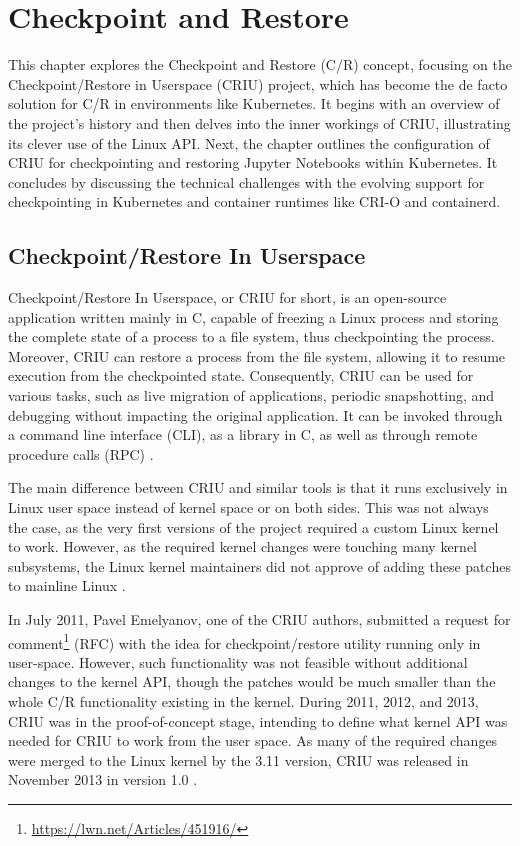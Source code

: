 \documentclass[
  digital,     %
  oneside,     %
  nosansbold,  %
  nocolorbold, %
  lof,         %
  nolot,         %
]{fithesis4}
\begin{document}
\chapter{Checkpoint and Restore}
\label{chap:cr}

This chapter explores the Checkpoint and Restore (C/R) concept, focusing on the Checkpoint/Restore in Userspace (CRIU) project, which has become the de facto solution for C/R in environments like Kubernetes. It begins with an overview of the project's history and then delves into the inner workings of CRIU, illustrating its clever use of the Linux API. Next, the chapter outlines the configuration of CRIU for checkpointing and restoring Jupyter Notebooks within Kubernetes. It concludes by discussing the technical challenges with the evolving support for checkpointing in Kubernetes and container runtimes like CRI-O and containerd.

\section{Checkpoint/Restore In Userspace}
Checkpoint/Restore In Userspace, or CRIU for short, is an open-source application written mainly in C, capable of freezing a Linux process and storing the complete state of a process to a file system, thus checkpointing the process. Moreover, CRIU can restore a process from the file system, allowing it to resume execution from the checkpointed state. Consequently, CRIU can be used for various tasks, such as live migration of applications, periodic snapshotting, and debugging without impacting the original application. It can be invoked through a command line interface (CLI), as a library in C, as well as through remote procedure calls (RPC) \cite{criu_main}.

The main difference between CRIU and similar tools is that it runs exclusively in Linux user space instead of kernel space or on both sides. This was not always the case, as the very first versions of the project required a custom Linux kernel to work. However, as the required kernel changes were touching many kernel subsystems, the Linux kernel maintainers did not approve of adding these patches to mainline Linux \cite{criu_podcast}.

In July 2011, Pavel Emelyanov, one of the CRIU authors, submitted a request for comment\footnote{\url{https://lwn.net/Articles/451916/}} (RFC) with the idea for checkpoint/restore utility running only in user-space. However, such functionality was not feasible without additional changes to the kernel API, though the patches would be much smaller than the whole C/R functionality existing in the kernel. During 2011, 2012, and 2013, CRIU was in the proof-of-concept stage, intending to define what kernel API was needed for CRIU to work from the user space. As many of the required changes were merged to the Linux kernel by the 3.11 version, CRIU was released in November 2013 in version 1.0 \cite{criu_history}. 
\end{document}
